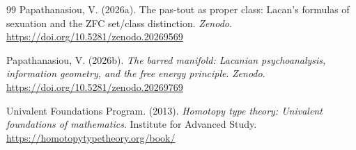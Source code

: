 \documentclass[12pt]{article}
\theoremstyle{definition}
\theoremstyle{remark}
\begin{document}
\begin{thebibliography}{99}
Papathanasiou, V. (2026a). The pas-tout as proper class: Lacan's formulas of sexuation and the ZFC set/class distinction. \textit{Zenodo}. \url{https://doi.org/10.5281/zenodo.20269569}

Papathanasiou, V. (2026b). \textit{The barred manifold: Lacanian psychoanalysis, information geometry, and the free energy principle}. \textit{Zenodo}. \url{https://doi.org/10.5281/zenodo.20269769}

Univalent Foundations Program. (2013). \textit{Homotopy type theory: Univalent foundations of mathematics}. Institute for Advanced Study. \url{https://homotopytypetheory.org/book/}

\end{thebibliography}
\end{document}
